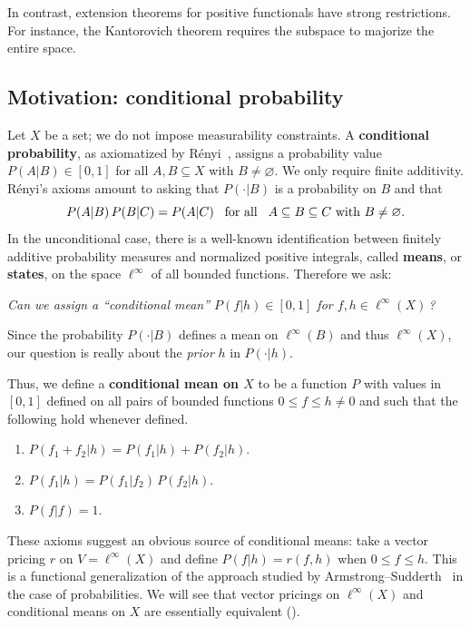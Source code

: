 \documentclass[11pt]{amsart}
\numberwithin{equation}{section}
\theoremstyle{definition}
\theoremstyle{definition}
\newcommand*{\se}{\subseteq}
\begin{document}
In contrast, extension theorems for positive functionals have strong restrictions. For instance, the Kantorovich theorem requires the subspace to majorize the entire space.

\subsection{Motivation: conditional probability}%
Let $X$ be a set; we do not impose measurability constraints. A \textbf{conditional probability}, as axiomatized by R{\'e}nyi~\cite{Renyi55}, assigns a probability value $P(A|B) \in[0,1]$ for all $A,B\se X$ with $B\neq\varnothing$. We only require finite additivity. R{\'e}nyi's axioms amount to asking that $P(\cdot|B)$ is a probability on $B$ and that
\begin{equation*}
P(A|B) \, P(B|C) = P(A|C) \kern3mm\text{for all} \kern3mm A\se B \se C \text{ with } B\neq \varnothing.
\end{equation*}
In the unconditional case, there is a well-known identification between finitely additive probability measures and normalized positive integrals, called \textbf{means}, or \textbf{states}, on the space $\ell^\infty$ of all bounded functions. Therefore we ask:

\medskip
\emph{Can we assign a ``conditional mean'' $P(f|h) \in[0,1]$ for ${f, h\in \ell^\infty(X)}$\,?}

\medskip\noindent
Since the probability $P(\cdot|B)$ defines a mean on $\ell^\infty(B)$ and thus $\ell^\infty(X)$, our question is really about the \emph{prior} $h$ in $P(\cdot | h)$.


\medskip
Thus, we define a \textbf{conditional mean on $X$} to be a function $P$ with values in $[0,1]$ defined on all pairs of bounded functions $0\leq f \leq h \neq 0$ and such that the following hold whenever defined.
\begin{enumerate}[left=2\parindent, labelsep=\parindent, topsep=3pt, itemsep=3pt, label=\normalfont(CM\arabic*)]
\item $P(f_1+f_2 | h) = P(f_1| h)+P(f_2 | h)$. \label{pt:CMX:add}
\item $P(f_1|h) = P(f_1|f_2)\, P(f_2|h)$.\label{pt:CMX:trans}
\item $P(f|f)=1$.\label{pt:CMX:one}
\end{enumerate}

\medskip
These axioms suggest an obvious source of conditional means: take a vector pricing $r$ on $V=\ell^\infty(X)$ and define $P(f|h) = r(f,h)$ when $0\leq f\leq h$. This is a functional generalization of the approach studied by Armstrong--Sudderth~\cite{Armstrong-Sudderth} in the case of probabilities. We will see that vector pricings on $\ell^\infty(X)$ and conditional means on $X$ are essentially equivalent ().
\end{document}
